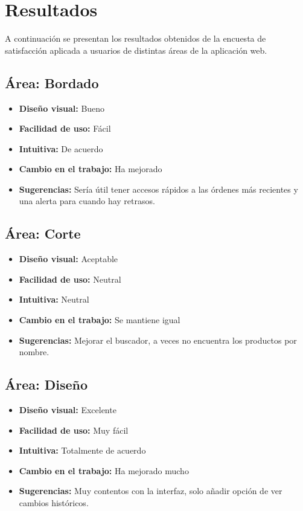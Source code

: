 \documentclass[12pt,letterpaper,spanish]{report}
\begin{document}
\section{Resultados}

A continuación se presentan los resultados obtenidos de la encuesta de satisfacción aplicada a usuarios de distintas áreas de la aplicación web.

\subsection*{Área: Bordado}
\begin{itemize}
    \item \textbf{Diseño visual:} Bueno
    \item \textbf{Facilidad de uso:} Fácil
    \item \textbf{Intuitiva:} De acuerdo
    \item \textbf{Cambio en el trabajo:} Ha mejorado
    \item \textbf{Sugerencias:} Sería útil tener accesos rápidos a las órdenes más recientes y una alerta para cuando hay retrasos.
\end{itemize}

\subsection*{Área: Corte}
\begin{itemize}
    \item \textbf{Diseño visual:} Aceptable
    \item \textbf{Facilidad de uso:} Neutral
    \item \textbf{Intuitiva:} Neutral
    \item \textbf{Cambio en el trabajo:} Se mantiene igual
    \item \textbf{Sugerencias:} Mejorar el buscador, a veces no encuentra los productos por nombre.
\end{itemize}

\subsection*{Área: Diseño}
\begin{itemize}
    \item \textbf{Diseño visual:} Excelente
    \item \textbf{Facilidad de uso:} Muy fácil
    \item \textbf{Intuitiva:} Totalmente de acuerdo
    \item \textbf{Cambio en el trabajo:} Ha mejorado mucho
    \item \textbf{Sugerencias:} Muy contentos con la interfaz, solo añadir opción de ver cambios históricos.
\end{itemize}
\end{document}
